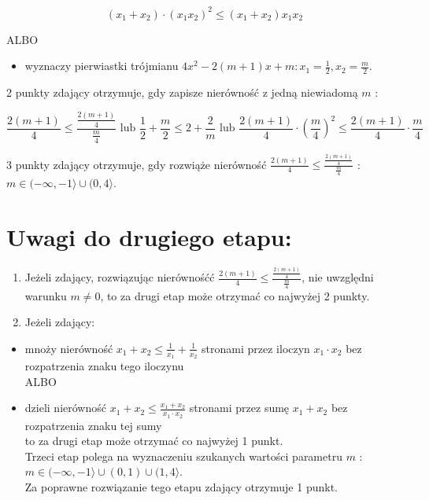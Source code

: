 \documentclass[10pt]{article}
\begin{document}
$$
\left(x_{1}+x_{2}\right) \cdot\left(x_{1} x_{2}\right)^{2} \leq\left(x_{1}+x_{2}\right) x_{1} x_{2}
$$

ALBO

\begin{itemize}
  \item wyznaczy pierwiastki trójmianu $4 x^{2}-2(m+1) x+m: x_{1}=\frac{1}{2}, x_{2}=\frac{m}{2}$.
\end{itemize}

2 punkty zdający otrzymuje, gdy zapisze nierówność z jedną niewiadomą $m$ :

$$
\frac{2(m+1)}{4} \leq \frac{\frac{2(m+1)}{4}}{\frac{m}{4}} \text { lub } \frac{1}{2}+\frac{m}{2} \leq 2+\frac{2}{m} \text { lub } \frac{2(m+1)}{4} \cdot\left(\frac{m}{4}\right)^{2} \leq \frac{2(m+1)}{4} \cdot \frac{m}{4}
$$

3 punkty zdający otrzymuje, gdy rozwiąże nierówność $\frac{2(m+1)}{4} \leq \frac{\frac{2(m+1)}{4}}{\frac{m}{4}}$ :\\
$m \in(-\infty,-1\rangle \cup(0,4\rangle$.

\section*{Uwagi do drugiego etapu:}
\begin{enumerate}
  \item Jeżeli zdający, rozwiązując nierównośćć $\frac{2(m+1)}{4} \leq \frac{\frac{2(m+1)}{4}}{\frac{m}{4}}$, nie uwzględni warunku $m \neq 0$, to za drugi etap może otrzymać co najwyżej 2 punkty.
  \item Jeżeli zdający:
\end{enumerate}

\begin{itemize}
  \item mnoży nierówność $x_{1}+x_{2} \leq \frac{1}{x_{1}}+\frac{1}{x_{2}}$ stronami przez iloczyn $x_{1} \cdot x_{2}$ bez rozpatrzenia znaku tego iloczynu\\
ALBO
  \item dzieli nierówność $x_{1}+x_{2} \leq \frac{x_{1}+x_{2}}{x_{1} \cdot x_{2}}$ stronami przez sumę $x_{1}+x_{2}$ bez rozpatrzenia znaku tej sumy\\
to za drugi etap może otrzymać co najwyżej 1 punkt.\\
Trzeci etap polega na wyznaczeniu szukanych wartości parametru $m$ :\\
$m \in(-\infty,-1\rangle \cup(0,1) \cup(1,4\rangle$.\\
Za poprawne rozwiązanie tego etapu zdający otrzymuje 1 punkt.
\end{itemize}
\end{document}
